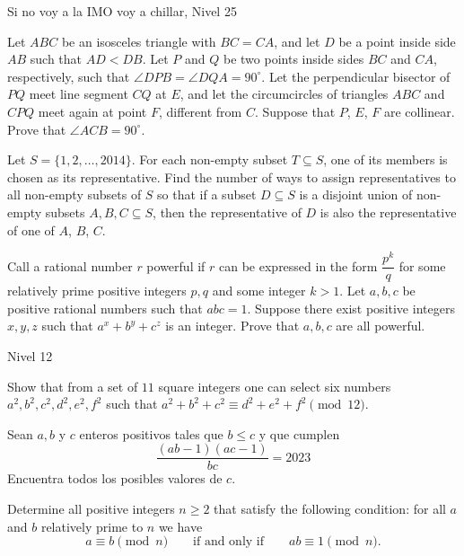 \documentclass[12pt]{article}
\begin{document}
\begin{examen}{Si no voy a la IMO voy a chillar, Nivel 25}{}
    \begin{problema}
        Let $ABC$ be an isosceles triangle with $BC=CA$, and let $D$ be a point inside side $AB$ such that $AD< DB$. Let $P$ and $Q$ be two points inside sides $BC$ and $CA$, respectively, such that $\angle DPB = \angle DQA = 90^{\circ}$. Let the perpendicular bisector of $PQ$ meet line segment $CQ$ at $E$, and let the circumcircles of triangles $ABC$ and $CPQ$ meet again at point $F$, different from $C$.
Suppose that $P$, $E$, $F$ are collinear. Prove that $\angle ACB = 90^{\circ}$.
    \end{problema}
    
    \begin{problema}
        Let $S = \{1,2,\dots,2014\}$. For each non-empty subset $T \subseteq S$, one of its members is chosen as its representative. Find the number of ways to assign representatives to all non-empty subsets of $S$ so that if a subset $D \subseteq S$ is a disjoint union of non-empty subsets $A, B, C \subseteq S$, then the representative of $D$ is also the representative of one of $A$, $B$, $C$.
    \end{problema}

    \begin{problema}
        Call a rational number $r$ powerful if $r$ can be expressed in the form $\dfrac{p^k}{q}$ for some relatively prime positive integers $p, q$ and some integer $k >1$. Let $a, b, c$ be positive rational numbers such that $abc = 1$. Suppose there exist positive integers $x, y, z$ such that $a^x + b^y + c^z$ is an integer. Prove that $a, b, c$ are all powerful.
    \end{problema}
\end{examen}

\begin{examen}{Nivel 12}{}
    \begin{problema}
        Show that from a set of $11$ square integers one can select six numbers $a^2,b^2,c^2,d^2,e^2,f^2$ such that $a^2+b^2+c^2 \equiv d^2+e^2+f^2\pmod{12}$.
    \end{problema}

    \begin{problema}
        Sean $a,b$ y $c$ enteros positivos tales que $b\leq c$ y que cumplen 
        \[ \frac{(ab-1)(ac-1)}{bc}=2023\]
        Encuentra todos los posibles valores de $c$. 
    \end{problema}
    
    \begin{problema}
       Determine all positive integers $ n\geq 2$ that satisfy the following condition: for all $ a$ and $ b$ relatively prime to $ n$ we have\[a \equiv b \pmod n\qquad\text{if and only if}\qquad ab\equiv 1 \pmod n.\]
        
    \end{problema}
\end{examen}
\end{document}
